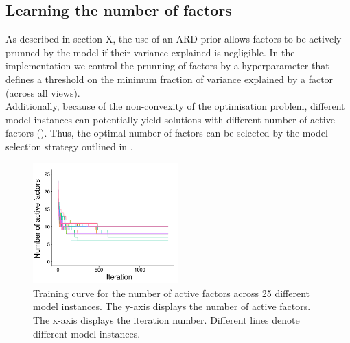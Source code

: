 



\subsection{Learning the number of factors} \label{section:mofa_nfactors}
As described in section X, the use of an ARD prior allows factors to be actively prunned by the model if their variance explained is negligible. In the implementation we control the prunning of factors by a hyperparameter that defines a threshold on the minimum fraction of variance explained by a factor (across all views).\\
Additionally, because of the non-convexity of the optimisation problem, different model instances can potentially yield solutions with different number of active factors (). Thus, the optimal number of factors can be selected by the model selection strategy outlined in .

\begin{figure}[H]
	\centering 	
	\includegraphics[width=0.5\textwidth]{MOFA_nfactors}
	\caption{Training curve for the number of active factors across 25 different model instances. The y-axis displays the number of active factors. The x-axis displays the iteration number. Different lines denote different model instances.}
	\label{fig:MOFA_nfactors}
\end{figure}


